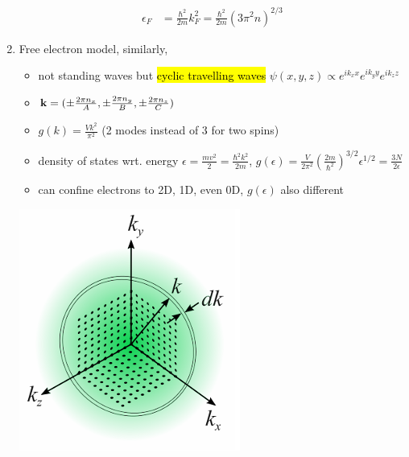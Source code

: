 \documentclass{article}
\theoremstyle{remark}
\theoremstyle{remark}
\begin{document}
\begin{enumerate}
\begin{minipage}{0.69\linewidth}
\begin{align*}
                \epsilon_F &= \frac{\hbar^2}{2m}k_F^2 = \frac{\hbar^2}{2m}\left(3\pi^2 n\right)^{2/3}
            \end{align*}
        \end{minipage}
    \item Free electron model, similarly, \begin{itemize}
            \item not standing waves but \hl{cyclic travelling waves} $\psi(x,y,z)\propto e^{ik_x x}e^{ik_y y}e^{ik_z z}$
            \item $\vb{k} = (\pm\frac{2\pi n_x}{A},\pm\frac{2\pi n_y}{B},\pm\frac{2\pi n_z}{C})$
            \item $\boxed{g(k)=\frac{Vk^2}{\pi^2}}$ (2 modes instead of 3 for two spins)
            \item density of states wrt. energy $\boxed{\epsilon = \frac{mv^2}{2} = \frac{\hbar^2k^2}{2m}}$, $\boxed{g(\epsilon)=\frac{V}{2\pi^2}\left(\frac{2m}{\hbar^2}\right)^{3/2}\epsilon^{1/2} = \frac{3N}{2\epsilon}}$
            \item can confine electrons to 2D, 1D, even 0D, $g(\epsilon)$ also different
        \end{itemize}
        \begin{minipage}{0.3\linewidth}
            \begin{center}
                \includegraphics*[width=\linewidth]{cmp_drude_model.png}

\end{center}
\end{minipage}
\end{enumerate}
\end{document}
